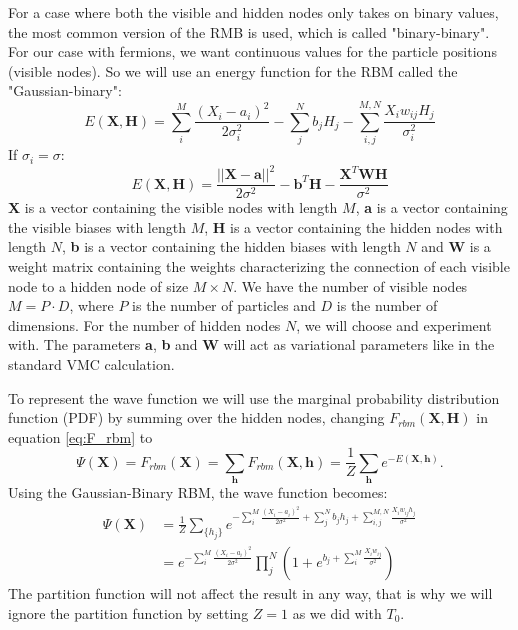 \documentclass[12pt,a4paper,english]{article}
\begin{document}
For a case where both the visible and hidden nodes only takes on binary values, the most common version of the RMB is used, which is called "binary-binary". For our case with fermions, we want continuous values for the particle positions (visible nodes). So we will use an energy function for the RBM called the "Gaussian-binary":
\begin{equation}
\label{eq:Gaussian_binary}
E(\textbf{X},\textbf{H})=\sum_{i}^{M}\frac{(X_i-a_i)^2}{2\sigma_i^2} - \sum_{j}^{N}b_jH_j - \sum_{i,j}^{M,N}\frac{X_iw_{ij}H_j}{\sigma_i^2}
\end{equation}
If $\sigma_i=\sigma$:
\begin{equation}
\label{eq:Gaussian_binary2}
E(\textbf{X},\textbf{H})=\frac{||\textbf{X}-\textbf{a}||^2}{2\sigma^2} - \textbf{b}^T\textbf{H} - \frac{\textbf{X}^T\textbf{W}\textbf{H}}{\sigma^2}
\end{equation}
\textbf{X} is a vector containing the visible nodes with length $M$, \textbf{a} is a vector containing the visible biases with length $M$, \textbf{H} is a vector containing the hidden nodes with length $N$, \textbf{b} is a vector containing the hidden biases with length $N$ and \textbf{W} is a weight matrix containing the weights characterizing the connection of each visible node to a hidden node of size $M\times N$. We have the number of visible nodes $M=P\cdot D$, where $P$ is the number of particles and $D$ is the number of dimensions. For the number of hidden nodes $N$, we will choose and experiment with. The parameters \textbf{a}, \textbf{b} and \textbf{W} will act as variational parameters like in the standard VMC calculation.

To represent the wave function we will use the marginal probability distribution function (PDF) by summing over the hidden nodes, changing $F_{rbm}(\textbf{X}, \textbf{H})$ in equation \ref{eq:F_rbm} to 
\begin{equation}
\label{eq:F_rbm_marginal}
\Psi(\textbf{X})=F_{rbm}(\textbf{X})=\sum_{\textbf{h}}F_{rbm}(\textbf{X}, \textbf{h})=\frac{1}{Z}\sum_{\textbf{h}}e^{-E(\textbf{X}, \textbf{h})}.
\end{equation}
Using the Gaussian-Binary RBM, the wave function becomes:
\begin{align}
\Psi(\textbf{X})&=\frac{1}{Z}\sum_{\{h_j\}}e^{-\sum_{i}^{M}\frac{(X_i-a_i)^2}{2\sigma^2} + \sum_{j}^{N}b_jh_j + \sum_{i,j}^{M,N}\frac{X_iw_{ij}h_j}{\sigma^2}}\nonumber\\
\label{eq:wave_func}
&=e^{-\sum_{i}^{M}\frac{(X_i-a_i)^2}{2\sigma^2}}\prod_{j}^{N}\left(1+e^{b_j + \sum_{i}^{M}\frac{X_iw_{ij}}{\sigma^2}}
\right)
\end{align}
The partition function will not affect the result in any way, that is why we will ignore the partition function by setting $Z=1$ as we did with $T_0$.
\end{document}
